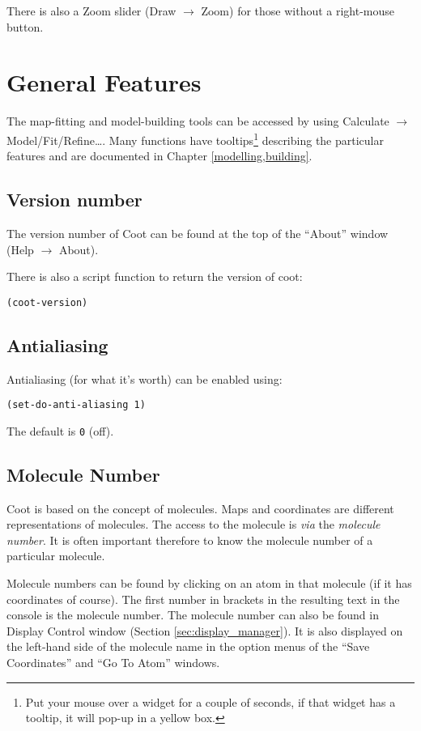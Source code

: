 \documentclass{book}
\begin{document}
There is also a Zoom slider (\textsf{Draw
  $\rightarrow$ Zoom}) for those without a right-mouse button.

\chapter{General Features}

The map-fitting and model-building tools can be accessed by using
\textsf{Calculate $\rightarrow$ Model/Fit/Refine\ldots}.  Many
functions have tooltips\footnote{Put your mouse over a
  widget for a couple of seconds, if that widget has a tooltip, it
  will pop-up in a yellow box.} describing the
particular features and are documented in Chapter
\ref{modelling,building}.

\section{Version number}
The version number of Coot can be found at the top of the ``About''
window (\textsf{Help $\rightarrow$ About}).

There is also a script function to return the version of coot:

\texttt{(coot-version)}

\section{Antialiasing}
Antialiasing (for what it's worth) can be enabled using:

\texttt{(set-do-anti-aliasing 1)}

The default is \texttt{0} (off).

\section{Molecule Number}
Coot is based on the concept of molecules.  Maps and coordinates are
different representations of molecules.  The access to the molecule is
\emph{via} the \emph{molecule number}.  It is often important therefore to
know the molecule number of a particular molecule.

Molecule numbers can be found by clicking on an atom in that molecule
(if it has coordinates of course). The first number in brackets in the
resulting text in the console is the molecule number.  The molecule
number can also be found in Display Control window (Section
\ref{sec:display_manager}).  It is also displayed on the left-hand
side of the molecule name in the option menus of the ``Save
Coordinates'' and ``Go To Atom'' windows.
\end{document}
